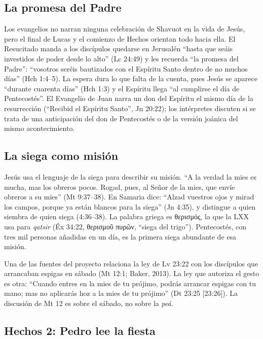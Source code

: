 \documentclass[11pt,letterpaper]{article}
\newcommand{\grc}[1]{\foreignlanguage{ancientgreek}{#1}}
\begin{document}
\subsection{La promesa del Padre}

Los evangelios no narran ninguna celebración de Shavuot en la vida de Jesús, pero el final de Lucas y el comienzo de Hechos orientan todo hacia ella. El Resucitado manda a los discípulos quedarse en Jerusalén ``hasta que seáis investidos de poder desde lo alto'' (Lc 24:49) y les recuerda ``la promesa del Padre'': ``vosotros seréis bautizados con el Espíritu Santo dentro de no muchos días'' (Hch 1:4--5). La espera dura lo que falta de la cuenta, pues Jesús se aparece ``durante cuarenta días'' (Hch 1:3) y el Espíritu llega ``al cumplirse el día de Pentecostés''. El Evangelio de Juan narra un don del Espíritu el mismo día de la resurrección (``Recibid el Espíritu Santo'', Jn 20:22); los intérpretes discuten si se trata de una anticipación del don de Pentecostés o de la versión joánica del mismo acontecimiento.

\subsection{La siega como misión}

Jesús usa el lenguaje de la siega para describir su misión. ``A la verdad la mies es mucha, mas los obreros pocos. Rogad, pues, al Señor de la mies, que envíe obreros a su mies'' (Mt 9:37--38). En Samaria dice: ``Alzad vuestros ojos y mirad los campos, porque ya están blancos para la siega'' (Jn 4:35), y distingue a quien siembra de quien siega (4:36--38). La palabra griega es \grc{θερισμός}, la que la LXX usa para \emph{qatsir} (Éx 34:22, \grc{θερισμοῦ πυρῶν}, ``siega del trigo''). Pentecostés, con tres mil personas añadidas en un día, es la primera siega abundante de esa misión.

\begin{nota}[Precisión]
Una de las fuentes del proyecto relaciona la ley de Lv 23:22 con los discípulos que arrancaban espigas en sábado (Mt 12:1; Baker, 2013). La ley que autoriza el gesto es otra: ``Cuando entres en la mies de tu prójimo, podrás arrancar espigas con tu mano; mas no aplicarás hoz a la mies de tu prójimo'' (Dt 23:25 [23:26]). La discusión de Mt 12 es sobre el sábado, no sobre la \emph{peá}.
\end{nota}

\subsection{Hechos 2: Pedro lee la fiesta}
\end{document}

